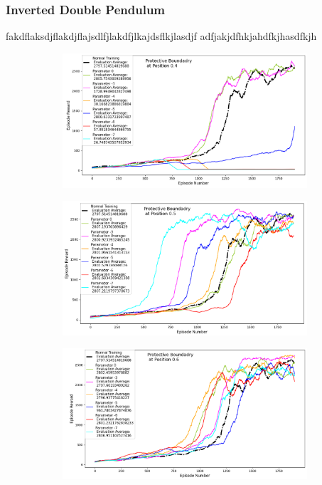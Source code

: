 \documentclass[journal]{IEEEtran}
\begin{document}
\subsubsection{Inverted Double Pendulum}
fakdflaksdjflakdjflajsdlfjlakdfjlkajdsflkjlasdjf
adfjakjdfhkjahdfkjhasdfkjh
\begin{figure}[H]
    \centering
    \begin{subfigure}[b]{0.5\textwidth}
      \centering
      \includegraphics[width=\textwidth]{Double_Pendulum_with_Boundary_at_0.4.png}
    \end{subfigure}
    \vspace*{0.0mm}
    \begin{subfigure}[b]{0.5\textwidth}
      \centering
      \includegraphics[width=\textwidth]{Double_Pendulum_with_Boundary_at_0.5.png}
    \end{subfigure}
    \vspace*{0.0mm}
    \begin{subfigure}[b]{0.5\textwidth}
      \centering
      \includegraphics[width=\textwidth]{Double_Pendulum_with_Boundary_at_0.6.png}

\end{subfigure}
\end{figure}
\end{document}

